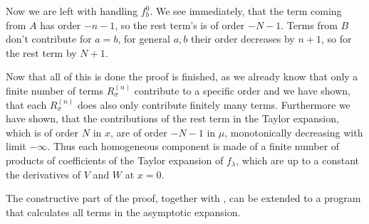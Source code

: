 \begin{MainTheorem}
\begin{Proof}
    Now we are left with handling $f^0_b$. We see immediately, that the term
    coming from $A$ has order $-n-1$, so the rest term's is of order $-N-1$.
    Terms from $B$ don't contribute for $a=b$, for general $a,b$ their order
    decreases by $n+1$, so for the rest term by $N+1$.


    Now that all of this is done the proof is finished, as we already know that
    only a finite number of terms $R^{(n)}_\sigma$ contribute to a specific
    order and we have shown, that each $R^{(n)}_\sigma$ does also only
    contribute finitely many terms. Furthermore we have shown, that the
    contributions of the rest term in the Taylor expansion, which is of order
    $N$ in $x$, are of order $-N-1$ in $\mu$, monotonically decreasing with
    limit $-\infty$. Thus each homogeneous component is made of a finite number
    of products of coefficients of the Taylor expansion of $f_\lambda$, which
    are up to a constant the derivatives of $V$ and $W$ at $x=0$.
  \end{Proof}
\end{MainTheorem}
The constructive part of the proof, together with , can be
extended to a program that calculates all terms in the asymptotic expansion.
